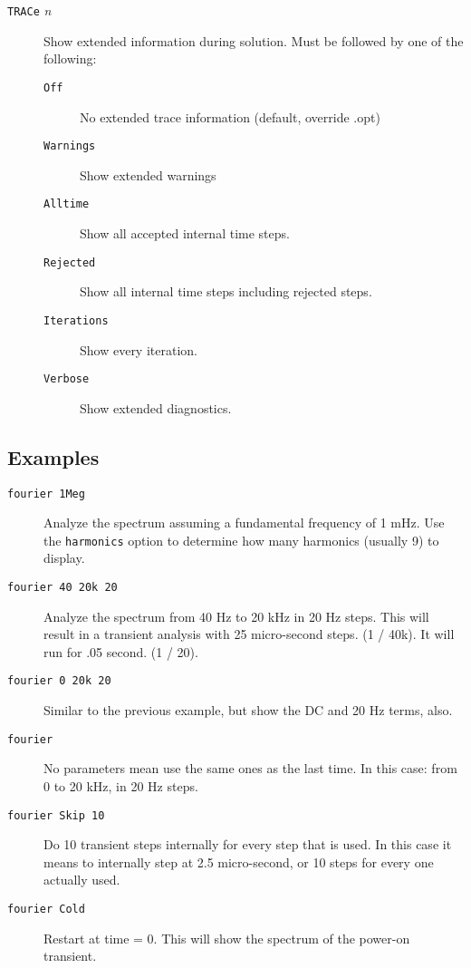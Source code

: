 \begin{description}
\item[{\tt TRACe} {\it n}] Show extended information during solution.
Must be followed by one of the following:
\begin{description}
\item[{\tt Off}] No extended trace information (default, override .opt)
\item[{\tt Warnings}] Show extended warnings
\item[{\tt Alltime}] Show all accepted internal time steps.
\item[{\tt Rejected}] Show all internal time steps including rejected steps.
\item[{\tt Iterations}] Show every iteration.
\item[{\tt Verbose}] Show extended diagnostics.
\end{description}

\end{description}
\subsection{Examples}

\begin{description}

\item[{\tt fourier 1Meg}] Analyze the spectrum assuming a fundamental
frequency of 1 mHz.  Use the {\tt harmonics} option to determine
how many harmonics (usually 9) to display.

\item[{\tt fourier 40 20k 20}] Analyze the spectrum from 40 Hz to 20 kHz in
20 Hz steps.  This will result in a transient analysis with 25 micro-second
steps.  (1 / 40k).  It will run for .05 second.  (1 / 20).

\item[{\tt fourier 0 20k 20}] Similar to the previous example, but show the
DC and 20 Hz terms, also.

\item[{\tt fourier}] No parameters mean use the same ones as the last time.
In this case: from 0 to 20 kHz, in 20 Hz steps.

\item[{\tt fourier Skip 10}] Do 10 transient steps internally for every step
that is used.  In this case it means to internally step at 2.5 micro-second,
or 10 steps for every one actually used.

\item[{\tt fourier Cold}] Restart at time = 0.  This will show the
spectrum of the power-on transient.



\end{description}
